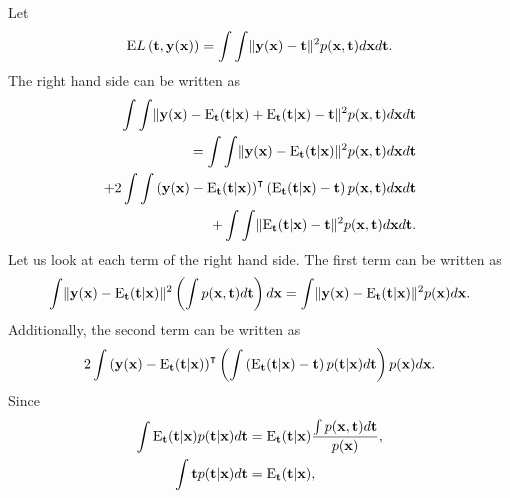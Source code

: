 \subsection{}
Let
%
\begin{equation}
{\rm E} L\left( \mathbf{t}, \mathbf{y} (\mathbf{x}) \right) = \int \int \lVert \mathbf{y}(\mathbf{x}) - \mathbf{t} \rVert ^ 2 p(\mathbf{x}, \mathbf{t}) d\mathbf{x} d\mathbf{t}.
\end{equation}
%
The right hand side can be written as
%
\begin{equation}
\begin{aligned}
\int \int \lVert \mathbf{y}(\mathbf{x}) - {\rm E}_\mathbf{t} (\mathbf{t} | \mathbf{x}) + {\rm E}_\mathbf{t} (\mathbf{t} | \mathbf{x}) - \mathbf{t} \rVert ^ 2 p(\mathbf{x}, \mathbf{t}) d\mathbf{x} d\mathbf{t} \\ 
= \int \int \lVert \mathbf{y}(\mathbf{x}) - {\rm E}_\mathbf{t} (\mathbf{t} | \mathbf{x}) \rVert ^ 2 p(\mathbf{x}, \mathbf{t}) d\mathbf{x} d\mathbf{t} \\
+ 2 \int \int \left( \mathbf{y}(\mathbf{x}) - {\rm E}_\mathbf{t} (\mathbf{t} | \mathbf{x}) \right) ^ \intercal \left( {\rm E}_\mathbf{t} (\mathbf{t} | \mathbf{x}) - \mathbf{t} \right) p(\mathbf{x}, \mathbf{t}) d\mathbf{x} d\mathbf{t} \\
+ \int \int \lVert {\rm E}_\mathbf{t} (\mathbf{t} | \mathbf{x}) - \mathbf{t} \rVert ^ 2 p(\mathbf{x}, \mathbf{t}) d\mathbf{x} d\mathbf{t}.
\end{aligned}
\end{equation}
%
Let us look at each term of the right hand side.
The first term can be written as
%
\begin{equation}
\int \lVert \mathbf{y}(\mathbf{x}) - {\rm E}_\mathbf{t} (\mathbf{t} | \mathbf{x}) \rVert ^ 2 \left( \int p(\mathbf{x}, \mathbf{t}) d\mathbf{t} \right) d\mathbf{x} = \int \lVert \mathbf{y}(\mathbf{x}) - {\rm E}_\mathbf{t} (\mathbf{t} | \mathbf{x}) \rVert ^ 2 p(\mathbf{x}) d\mathbf{x}.
\end{equation}
%
Additionally, the second term can be written as
%
\begin{equation}
2 \int \left( \mathbf{y}(\mathbf{x}) - {\rm E}_\mathbf{t} (\mathbf{t} | \mathbf{x}) \right) ^ \intercal \left( \int \left( {\rm E}_\mathbf{t} (\mathbf{t} | \mathbf{x}) - \mathbf{t} \right) p(\mathbf{t} | \mathbf{x}) d\mathbf{t} \right) p(\mathbf{x}) d\mathbf{x}.
\end{equation}
%
Since
%
\begin{equation}
\begin{aligned}
\int {\rm E}_\mathbf{t} (\mathbf{t} | \mathbf{x}) p(\mathbf{t} | \mathbf{x}) d\mathbf{t} &= {\rm E}_\mathbf{t} (\mathbf{t} | \mathbf{x}) \frac{\int p(\mathbf{x}, \mathbf{t}) d\mathbf{t}}{p(\mathbf{x})}, \\
\int \mathbf{t} p(\mathbf{t} | \mathbf{x}) d\mathbf{t} &= {\rm E}_\mathbf{t} (\mathbf{t} | \mathbf{x}),
\end{aligned}
\end{equation}
